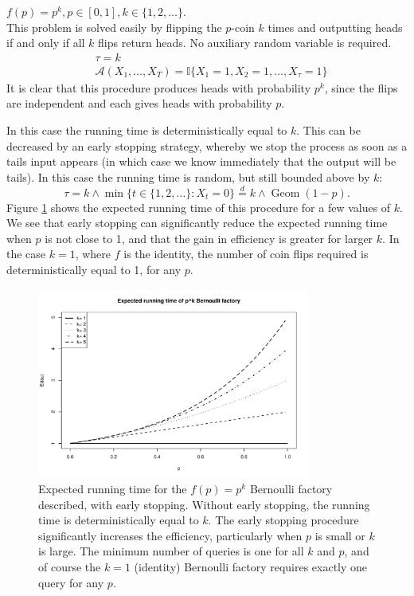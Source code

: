 \documentclass{article}
\theoremstyle{definition}
\newenvironment{example}
  {\pushQED{\qed}\renewcommand{\qedsymbol}{$\triangle$}\examplex}
  {\popQED\endexamplex}
\newcommand{\eqdist}{\overset{d}{=}}
\newcommand{\Geom}{\operatorname{Geom}}
\newcommand{\A}{\mathcal{A}}
\begin{document}
\begin{example}\label{ex:bf_pk}
$f(p) = p^k, p\in[0,1], k\in\{1,2,\dots\}$.\\
This problem is solved easily by flipping the $p$-coin $k$ times and outputting heads if and only if all $k$ flips return heads. No auxiliary random variable is required.
\begin{align*}
& \tau = k \\
& \A(X_1,\dots,X_T) = \mathbb{I}\{X_1 =1, X_2=1 ,\dots,X_\tau=1\}
\end{align*}
It is clear that this procedure produces heads with probability $p^k$, since the flips are independent and each gives heads with probability $p$.

In this case the running time is deterministically equal to $k$. 
This can be decreased by an early stopping strategy, whereby we stop the process as soon as a tails input appears (in which case we know immediately that the output will be tails). In this case the running time is random, but still bounded above by $k$:
\begin{equation*}
\tau = k \wedge \min\{t \in \{1,2,\dots\}:X_t=0 \} \eqdist k \wedge \Geom(1-p).
\end{equation*}
Figure \ref{fig:p2_runtime} shows the expected running time of this procedure for a few values of $k$. We see that early stopping can significantly reduce the expected running time when $p$ is not close to 1, and that the gain in efficiency is greater for larger $k$. In the case $k=1$, where $f$ is the identity, the number of coin flips required is deterministically equal to 1, for any $p$.
\begin{figure}
\centering
\includegraphics[width=0.8\textwidth]{pk_runtime.pdf}
\caption{Expected running time for the $f(p)=p^k$ Bernoulli factory described, with early stopping. Without early stopping, the running time is deterministically equal to $k$. The early stopping procedure significantly increases the efficiency, particularly when $p$ is small or $k$ is large. The minimum number of queries is one for all $k$ and $p$, and of course the $k=1$ (identity) Bernoulli factory requires exactly one query for any $p$.}\label{fig:p2_runtime}
\end{figure}
\end{example}
\end{document}
